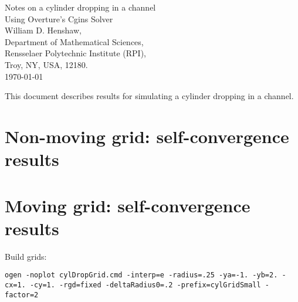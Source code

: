 \documentclass[11pt]{article}
\begin{document}


\newcommand{\dt}{{\Delta t}}

\newcommand{\Bc}{{\mathcal B}}
\newcommand{\Dc}{{\mathcal D}}
\newcommand{\Ec}{{\mathcal E}}
\newcommand{\Fc}{{\mathcal F}}
\newcommand{\Gc}{{\mathcal G}}
\newcommand{\Hc}{{\mathcal H}}
\newcommand{\Ic}{{\mathcal I}}
\newcommand{\Jc}{{\mathcal J}}
\newcommand{\Lc}{{\mathcal L}}
\newcommand{\Nc}{{\mathcal N}}
\newcommand{\Pc}{{\mathcal P}}
\newcommand{\Rc}{{\mathcal R}}
\newcommand{\Sc}{{\mathcal S}}

\newcommand{\bogus}[1]{}  %

\vspace{5\baselineskip}
\begin{flushleft}
{\LARGE
Notes on a cylinder dropping in a channel \\
Using Overture's Cgins Solver\\
}
\vspace{2\baselineskip}
William D. Henshaw, \\
% 
\vspace{2\baselineskip}
% 
Department of Mathematical Sciences, \\
Rensselaer Polytechnic Institute (RPI), \\
Troy, NY, USA, 12180. \\
\vspace{\baselineskip}
\today\\

\vspace{4\baselineskip}


This document describes results for simulating a cylinder dropping in a channel.

\end{flushleft}

\tableofcontents

\clearpage


\section{Non-moving grid: self-convergence results}

\section{Moving grid: self-convergence results}

Build grids:
{\footnotesize
\begin{verbatim}
ogen -noplot cylDropGrid.cmd -interp=e -radius=.25 -ya=-1. -yb=2. -cx=1. -cy=1. -rgd=fixed -deltaRadius0=.2 -prefix=cylGridSmall -factor=2
\end{verbatim}
}
\end{document}
